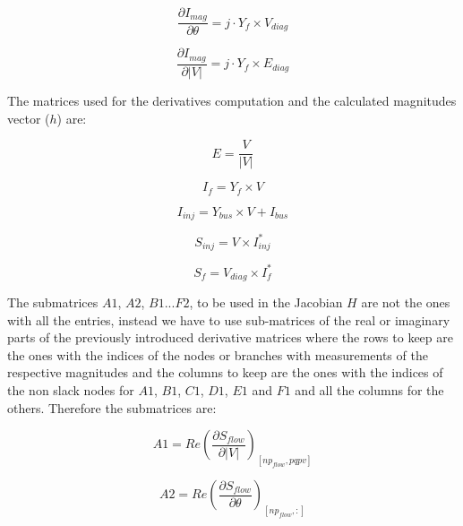 \documentclass[a4paper,twoside,fleqn]{tufte-book}
\begin{document}
\begin{equation}\frac{\partial I_{mag}}{\partial \theta} = j \cdot Y_f \times V_{diag} 
\end{equation}

\begin{equation}\frac{\partial I_{mag}}{\partial |V|}=j \cdot Y_f \times E_{diag} 
\end{equation}

The matrices used for the derivatives computation and the calculated magnitudes vector ($h$) are:

\begin{equation}E=\frac{V}{|V|}\end{equation}  

\begin{equation}
I_f=Y_f \times V 
\label{eq:current_from}
\end{equation}

\begin{equation}
I_{inj}=Y_{bus}  \times  V + I_{bus}
\label{eq:current_inj}
\end{equation}

\begin{equation}
S_{inj} = V  \times  I_{inj}^*
\label{eq:power_injection}
\end{equation}

\begin{equation}
S_f = V_{diag} \times I_{f}^*
\label{eq:power_from}
\end{equation}

The submatrices $A1$, $A2$, $B1$...$F2$, to be used in the Jacobian $H$ are not the ones with all the entries, instead we have to use sub-matrices of the real or imaginary parts of the previously introduced derivative matrices where the rows to keep are the ones with the indices of the nodes or branches with measurements of the respective magnitudes and the columns to keep are the ones with the indices of the non slack nodes for $A1$, $B1$, $C1$, $D1$, $E1$ and $F1$ and all the columns for the others. Therefore the submatrices are:

\begin{equation}
A1 = Re\left(\frac{\partial S_{flow}}{\partial |V|}\right)_{[np_{flow}, pqpv]}
\end{equation}

\begin{equation}
A2 = Re\left(\frac{\partial S_{flow}}{\partial \theta}\right)_{[np_{flow}, :]}
\end{equation}
\end{document}

